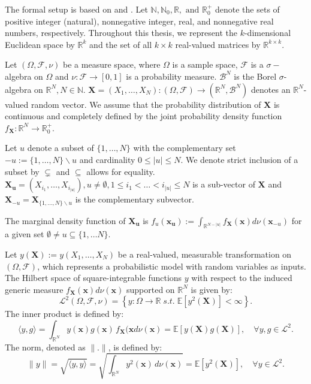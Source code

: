 The formal setup is based on \cite{rahman2014} and \cite{chastaing2012}.
Let $\mathbb{N}, \mathbb{N}_0, \mathbb{R}, \text{ and } \mathbb{R}_0^{+}$ denote the sets of positive integer (natural), nonnegative integer, real, and nonnegative real numbers, respectively. Throughout this thesis, we represent the $k$-dimensional Euclidean space by $\mathbb{R}^k$ and the set of all $k \times k$ real-valued matrices by $\mathbb{R}^{k \times k}$.

Let $(\Omega, \mathcal{F}, \nu)$ be a measure space, where $\Omega$ is a sample space, $\mathcal{F}$ is a $\sigma-$algebra on $\Omega$ and $\nu: \mathcal{F} \rightarrow [0, 1]$ is a probability measure. $\mathcal{B}^N$ is the Borel $\sigma$-algebra on $\mathbb{R}^N, N \in \mathbb{N}$.
$\boldsymbol{X} = (X_1, \dots, X_N): (\Omega, \mathcal{F}) \rightarrow (\mathbb{R}^N, \mathcal{B}^N)$ denotes an $\mathbb{R}^N$-valued random vector.
We assume that the probability distribution of $\boldsymbol{X}$ is continuous and completely defined by the joint probability density function $f_{\boldsymbol{X}}: \mathbb{R}^N \rightarrow \mathbb{R}_{0}^+$. %

Let $u$ denote a subset of $\{1, \dots, N\}$ with the complementary set  $-u := \{1, \dots, N\} \backslash{} u$ and cardinality $0 \leq |u| \leq N$. We denote strict inclusion of a subset by $\subsetneq$ and $\subseteq$ allows for equality.
$\boldsymbol{X_u} = (X_{i_1}, \dots, X_{i_{|u|}}), u \neq \emptyset, 1 \leq i_1 < \dots < i_{|u|} \leq N$ is a sub-vector of $\boldsymbol{X}$ and $\boldsymbol{X}_{-u} = \boldsymbol{X}_{\{1, \dots, N\} \backslash{} u}$ is the complementary subvector.

The marginal density function of $\boldsymbol{X_u}$ is $f_u(\boldsymbol{x_u}) := \int_{\mathbb{R}^{N-|u|}} f_{\boldsymbol{X}}(\boldsymbol{x})d \nu (\boldsymbol{x}_{-u})$ for a given set $\emptyset \neq u \subseteq \{1, \dots N\}$.

Let $y(\boldsymbol{X}) := y(X_1, \dots, X_N)$ be a real-valued, measurable transformation on $(\Omega, \mathcal{F})$, which represents a probabilistic model with random variables as inputs. The Hilbert space of square-integrable functions $y$ with respect to the induced generic measure $f_{\boldsymbol{X}}(\boldsymbol{x})d \nu (\boldsymbol{x})$ supported on $\mathbb{R}^N$ is given by:
\[
\mathcal{L}^2(\Omega, \mathcal{F}, \nu) = \left\{ y: \Omega \rightarrow \mathbb{R} \; \textit{s.t.} \; \mathbb{E}[y^2(\boldsymbol{X})] < \infty \right\}.
\]
The inner product is defined by:
\[
\langle y, g \rangle = \int_{\mathbb{R}^N} y(\boldsymbol{x}) g(\boldsymbol{x}) \, f_{\boldsymbol{X}}(\boldsymbol{x}d\nu(\boldsymbol{x}) = \mathbb{E}[y(\boldsymbol{X})g(\boldsymbol{X})], \quad \forall y,g \in \mathcal{L}^2.
\]
The norm, denoted as $\|.\|$, is defined by:
\[
\|y\| = \sqrt{\langle y, y \rangle} = \sqrt{\int_{\mathbb{R}^N} y^2(\boldsymbol{x}) \, d\nu(\boldsymbol{x})} = \mathbb{E}[y^2(\boldsymbol{X})], \quad \forall y \in \mathcal{L}^2.
\]

